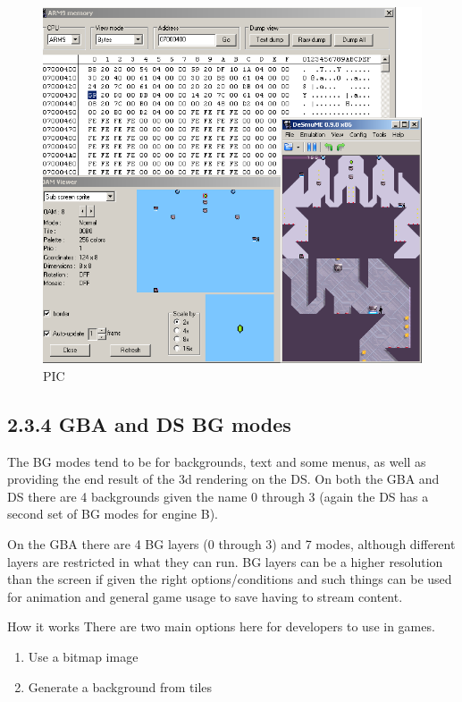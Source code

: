 \documentclass[
]{book}
\providecommand{\tightlist}{%
  \setlength{\itemsep}{0pt}\setlength{\parskip}{0pt}}
\begin{document}
\begin{figure}
\centering
\includegraphics{images/34_home_fast6191_romhackingguide_unrenamed_file___ginal_borders_romhackingguide2dOAMdesmume_2.png}
\caption{PIC}
\end{figure}

\hypertarget{gba-and-ds-bg-modes}{%
\subsection{2.3.4 GBA and DS BG modes}\label{gba-and-ds-bg-modes}}

The BG modes tend to be for backgrounds, text and some menus, as well as providing the end result of the 3d rendering on the DS. On both the GBA and DS there are 4 backgrounds given the name 0 through 3 (again the DS has a second set of BG modes for engine B).

On the GBA there are 4 BG layers (0 through 3) and 7 modes, although different layers are restricted in what they can run. BG layers can be a higher resolution than the screen if given the right options/conditions and such things can be used for animation and general game usage to save having to stream content.

How it works There are two main options here for developers to use in games.

\begin{enumerate}
\def\labelenumi{\arabic{enumi}.}
\tightlist
\item
  Use a bitmap image
\item
  Generate a background from tiles
\end{enumerate}
\end{document}
